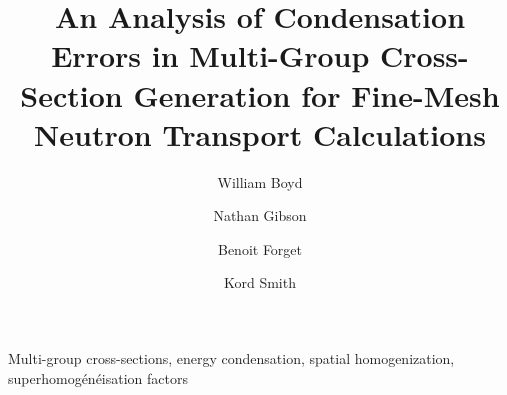 \documentclass[authoryear,5p]{elsarticle}
\begin{document}
\begin{frontmatter}

\title{An Analysis of Condensation Errors in Multi-Group Cross-Section Generation for Fine-Mesh Neutron Transport Calculations}

\author{William Boyd}

\author{Nathan Gibson\corref{}}

\author{Benoit Forget\corref{}}

\author{Kord Smith\corref{}}

\address{Massachusetts Institute of Technology, Department of Nuclear Science and Engineering, 77 Massachusetts Avenue, Building 24, Cambridge, MA 02139, United States\vspace{-8ex}}


\begin{abstract}

\end{abstract}

\begin{keyword}
Multi-group cross-sections, energy condensation, spatial homogenization, superhomog\'{e}n\'{e}isation factors
\end{keyword}

\end{frontmatter}

%
\end{document}
